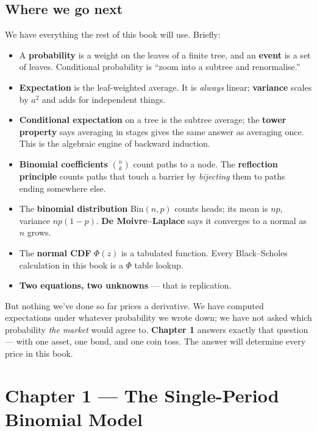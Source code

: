 \documentclass[
  10pt,
  twoside]{book}
\providecommand{\tightlist}{%
  \setlength{\itemsep}{0pt}\setlength{\parskip}{0pt}}
\begin{document}
\section{Where we go next}\label{where-we-go-next}

We have everything the rest of this book will use. Briefly:

\begin{itemize}
\tightlist
\item
  A \textbf{probability} is a weight on the leaves of a finite tree, and
  an \textbf{event} is a set of leaves. Conditional probability is
  ``zoom into a subtree and renormalise.''
\item
  \textbf{Expectation} is the leaf-weighted average. It is \emph{always}
  linear; \textbf{variance} scales by \(a^2\) and adds for independent
  things.
\item
  \textbf{Conditional expectation} on a tree is the subtree average; the
  \textbf{tower property} says averaging in stages gives the same answer
  as averaging once. This is the algebraic engine of backward induction.
\item
  \textbf{Binomial coefficients} \(\binom{n}{k}\) count paths to a node.
  The \textbf{reflection principle} counts paths that touch a barrier by
  \emph{bijecting} them to paths ending somewhere else.
\item
  The \textbf{binomial distribution} Bin\((n, p)\) counts heads; its
  mean is \(np\), variance \(np(1-p)\). \textbf{De Moivre--Laplace} says
  it converges to a normal as \(n\) grows.
\item
  The \textbf{normal CDF} \(\Phi(z)\) is a tabulated function. Every
  Black--Scholes calculation in this book is a \(\Phi\) table lookup.
\item
  \textbf{Two equations, two unknowns} --- that is replication.
\end{itemize}

But nothing we've done so far prices a derivative. We have computed
expectations under whatever probability we wrote down; we have not asked
which probability \emph{the market} would agree to. \textbf{Chapter 1}
answers exactly that question --- with one asset, one bond, and one coin
toss. The answer will determine every price in this book.

\newpage

\chapter{Chapter 1 --- The Single-Period Binomial
Model}\label{chapter-1-the-single-period-binomial-model}
\end{document}
